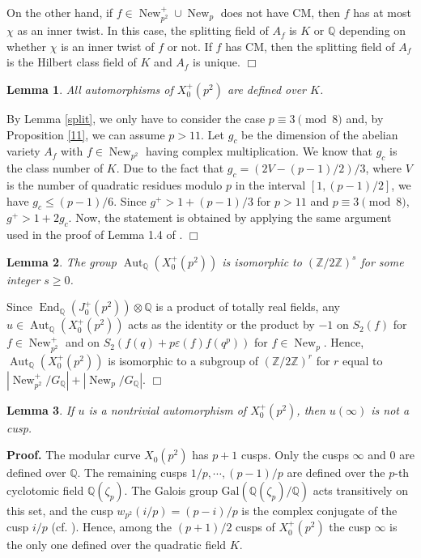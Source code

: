 \documentclass[a4paper,12pt]{article}
\newtheorem{lema}{Lemma}%
\theoremstyle{definition}
\theoremstyle{remark}
\numberwithin{equation}{section}
\newcommand{\Q}{\mathbb{Q}}
\newcommand{\Z}{\mathbb{Z}}
\newcommand{\Gal}{\mathrm{Gal}}
\newcommand{\End}{\operatorname{End}}
\newcommand{\Aut}{\operatorname{Aut}}
\newcommand{\New}{\operatorname{New}}
\begin{document}
On the other hand, if  $f\in\New_{p^2}^+\cup\New_p$ does not have CM, then $f$ has at most $\chi$ as an inner twist. In this case, the splitting field of $A_f$ is $K$ or $\Q$ depending on whether $\chi$ is an inner twist of $f$ or not. If $f$ has CM, then the splitting field of $A_f$ is the Hilbert class field of $K$  and $A_f$ is unique.
  \hfill $\Box$
\begin{lema}\label{defi}  All automorphisms  of $ X_0^+(p^2)$ are defined over $K$.


\end{lema}
 By Lemma \ref{split}, we only have to consider the case $p\equiv 3 \pmod 8$ and, by Proposition \ref{11}, we can assume $p>11$. Let $g_c$ be the dimension of the  abelian variety $A_f$ with $f\in\New_{p^2}$ having complex multiplication. We know that $g_c$ is the class number of $K$. Due to the fact that $g_c=(2V-(p-1)/2)/3$, where $V$ is the number of quadratic residues modulo $p$ in the interval $[1,(p-1)/2]$, we have $g_c\leq (p-1)/6$.  Since $g^+> 1+(p-1)/3$ for $p>11$ and $p\equiv 3 \pmod 8$, $g^+>  1+2 g_c$. Now, the statement is obtained  by applying  the same argument   used in the proof of Lemma 1.4 of \cite{KM}.
\hfill $\Box$

\begin{lema}
 The group $ \Aut_\Q (X_0^+(p^2))$ is isomorphic to $(\Z/2\Z)^s$ for some integer $s\geq 0$.
 \end{lema}
Since  $\End_\Q(J_0^+(p^2))\otimes \Q$ is a product of totally real fields, any $u\in \Aut_\Q(X_0^+(p^2))$ acts as the identity or the product by $-1$ on $S_2(f)$ for $f\in\New_{p^2}^+$ and on $S_2(f(q)+p\varepsilon(f)f(q^p))$ for $f\in\New_p$.
 Hence, $\Aut_\Q(X_0^+(p^2))$ is isomorphic to a subgroup of $(\Z/2\Z)^r$ for $r$ equal to  $ |\New_{p^2}^+/G_\Q|+| \New_{p}/G_\Q|$. \hfill $\Box$

 \begin{lema}\label{overQ}
If  $u$ is  a nontrivial automorphism of $X_0^+(p^2)$, then  $u(\infty)$ is not a cusp.
\end{lema}
\noindent
{\bf Proof.}
 The modular curve $X_0(p^2)$ has $p+1$ cusps. Only the cusps $\infty$ and $0$ are defined over $\Q$. The remaining cusps $1/p,\cdots, (p-1)/p$ are defined over the $p$-th cyclotomic field $\Q(\zeta_p)$. The Galois group $\Gal(\Q(\zeta_p)/\Q)$ acts transitively on this set, and the cusp $w_{p^2}(i/p)=(p-i)/p$ is the  complex conjugate of the cusp $i/p$ (cf. \cite{Ogg}). Hence,  among the $(p+1)/2$  cusps of  $X_0^+(p^2)$  the cusp $\infty$ is the only one  defined over the quadratic field  $K$.
\end{document}
